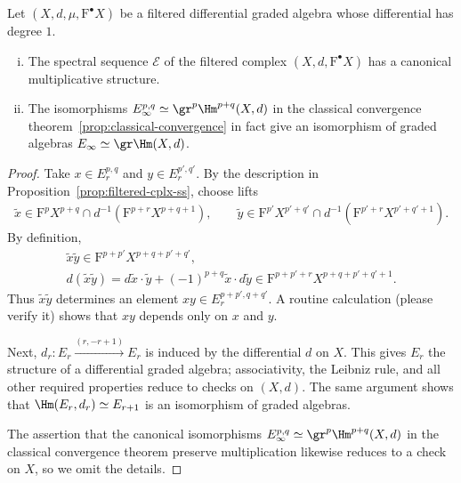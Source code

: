 \begin{proposition}\label{prop:dga-mult-ss}
	Let $(X,d,\mu,\mathrm{F}^\bullet X)$ be a filtered differential graded
	algebra whose differential has degree $1$.
	\begin{enumerate}[(i)]
		\item The spectral sequence $\mathscr{E}$ of the filtered complex
		$(X,d,\mathrm{F}^\bullet X)$ has a canonical multiplicative structure.
		\item The isomorphisms
		$E_\infty^{p,q}\simeq\gr^p\Hm^{p+q}(X,d)$ in the classical convergence
		theorem~\ref{prop:classical-convergence} in fact give an isomorphism of
		graded algebras $E_\infty\simeq\gr\Hm(X,d)$.
	\end{enumerate}
\end{proposition}
\begin{proof}
	Take $x\in E_r^{p,q}$ and $y\in E_r^{p',q'}$. By the description in
	Proposition~\ref{prop:filtered-cplx-ss}, choose lifts
	\begin{gather*}
		\widetilde{x}\in\mathrm{F}^pX^{p+q}\cap
		d^{-1}\left(\mathrm{F}^{p+r}X^{p+q+1}\right),\qquad
		\widetilde{y}\in\mathrm{F}^{p'}X^{p'+q'}\cap
		d^{-1}\left(\mathrm{F}^{p'+r}X^{p'+q'+1}\right).
	\end{gather*}
	By definition,
	\begin{gather*}
		\widetilde{x}\widetilde{y}\in
		\mathrm{F}^{p+p'}X^{p+q+p'+q'},\\
		d(\widetilde{x}\widetilde{y})
		=d\widetilde{x}\cdot\widetilde{y}
		+(-1)^{p+q}\widetilde{x}\cdot d\widetilde{y}
		\in\mathrm{F}^{p+p'+r}X^{p+q+p'+q'+1}.
	\end{gather*}
	Thus $\widetilde{x}\widetilde{y}$ determines an element
	$xy\in E_r^{p+p',q+q'}$. A routine calculation (please verify it) shows
	that $xy$ depends only on $x$ and $y$.

	Next, $d_r:E_r\xrightarrow{(r,-r+1)}E_r$ is induced by the differential
	$d$ on $X$. This gives $E_r$ the structure of a differential graded
	algebra; associativity, the Leibniz rule, and all other required properties
	reduce to checks on $(X,d)$. The same argument shows that
	$\Hm(E_r,d_r)\simeq E_{r+1}$ is an isomorphism of graded algebras.

	The assertion that the canonical isomorphisms
	$E_\infty^{p,q}\simeq\gr^p\Hm^{p+q}(X,d)$ in the classical convergence
	theorem preserve multiplication likewise reduces to a check on $X$, so we
	omit the details.
\end{proof}

